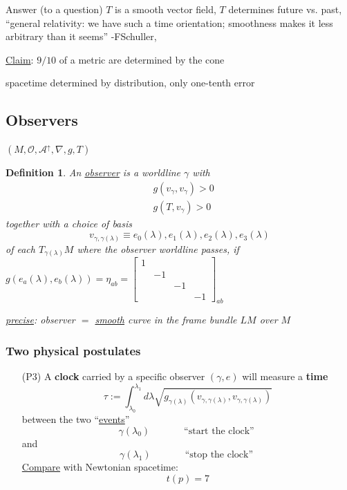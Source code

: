 \documentclass[10pt]{amsart}
\newtheorem{definition}{Definition}
\begin{document}
\begin{multicols*}{2}
	Answer (to a question) $T$ is a smooth vector field, $T$ determines future vs. past, ``general relativity: we have such a time orientation; smoothness makes it less arbitrary than it seems'' -FSchuller,
	
	
	\underline{Claim}: $9/10$ of a metric are determined by the cone
	
	spacetime determined by distribution, only one-tenth error 
	
	\subsection{Observers} $(M,\mathcal{O}, \mathcal{A}^{\uparrow},\nabla ,g, T)$
	\begin{definition}
		An \underline{observer} is a worldline $\gamma$ with
		\[
		\begin{aligned}
		& g(v_{\gamma}, v_{\gamma}) >  0 \\ 
		& g(T,v_{\gamma}) > 0 
		\end{aligned}
		\]
		together with a choice of basis
		\[
		v_{\gamma,\gamma(\lambda)} \equiv e_0(\lambda) , e_1(\lambda), e_2(\lambda), e_3(\lambda)
		\]
		of each $T_{\gamma(\lambda)}M$ where the observer worldline passes, if $g(e_a(\lambda), e_b(\lambda)) = \eta_{ab} = \left[ \begin{matrix} 1 & & & \\ & -1 & & \\ & & -1 & \\ & & & -1 \end{matrix} \right]_{ab}$
		
		\underline{precise}: observer $=$ \underline{smooth} curve in the frame bundle $LM$ over $M$
	\end{definition}
	
	\subsubsection{Two physical postulates}
	
	\begin{enumerate}
		\item[(P3)] A \textbf{clock} carried by a specific observer $(\gamma, e)$ will measure a \textbf{time}
		\[
		\tau := \int_{\lambda_0}^{\lambda_1} d\lambda \sqrt{ g_{\gamma(\lambda)}(v_{\gamma,\gamma(\lambda)}, v_{\gamma,\gamma(\lambda)}) }
		\]
		between the two ``\underline{events}''
		\[
		\gamma(\lambda_0) \quad \quad \quad \, \text{ ``start the clock'' }
		\]
		and 
		\[
		\gamma(\lambda_1) \quad \quad \quad \, \text{ ``stop the clock'' }
		\]
		\underline{Compare} with Newtonian spacetime:
		\[
		t(p)=7
		\]
		

\end{enumerate}
\end{multicols*}
\end{document}
